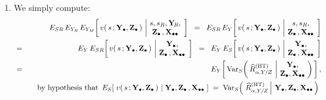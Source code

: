\begin{enumerate}
\item
    We simply compute:
    \begin{eqnarray*}
    &&
        E_{SR}\,
        E_{Y_{R}}\,
        E_{Y_{M}}\!\left[\,
            v(\,s\,;\Ydot,\Zdot\,)
            \,\left\vert\!
            \begin{array}{c} s,s_{R},\YsubR, \\ \Zdot\,,\Xobs \end{array}
            \right.
            \!\right]
    \;\; = \;\;
        E_{SR}\,
        E_{Y}\!\left[\,
            v(\,s\,;\Ydot,\Zdot\,)
            \,\left\vert\!
            \begin{array}{c} s,s_{R}, \\ \Zdot\,,\Xobs \end{array}
            \right.
            \!\right]
    \\
    & = &
        E_{Y}\,
        E_{SR}\!\left[\,
            v(\,s\,;\Ydot,\Zdot\,)
            \,\left\vert\!
            \begin{array}{c} \Ydot, \\ \Zdot\,,\Xobs \end{array}
            \right.
            \!\right]
    \;\; = \;\;
        E_{Y}\,
        E_{S}\!\left[\,
            v(\,s\,;\Ydot,\Zdot\,)
            \,\left\vert\!
            \begin{array}{c} \Ydot, \\ \Zdot\,,\Xobs \end{array}
            \right.
            \!\right]
    \\
    & = &
        E_{Y}\!\left[\,
            \Var_{S}\!\left(\,
                \widehat{R}^{\textnormal{(HT)}}_{\alpha,Y/Z}
                \,\left\vert\!
                \begin{array}{c} \Ydot, \\ \Zdot, \Xobs \end{array}
                \right.
                \!\!\right)
            \,\right],
    \\
    &&
    \quad
    \textnormal{by hypothesis that
    \,$
    E_{S}\!\left[\;
        v(\,s\,;\Ydot,\Zdot\,)
        \,\left\vert\;
        \Ydot,\Zdot\,,\Xobs
        \right.
        \,\right]
    \; = \;
        \Var_{S}\!\left(\,
            \left.
            \widehat{R}^{\textnormal{(HT)}}_{\alpha,Y/Z}
            \,\right\vert\,
            \Ydot,
            \Zdot,
            \Xobs
            \,\right)
    $
    }
    \end{eqnarray*}

\end{enumerate}
